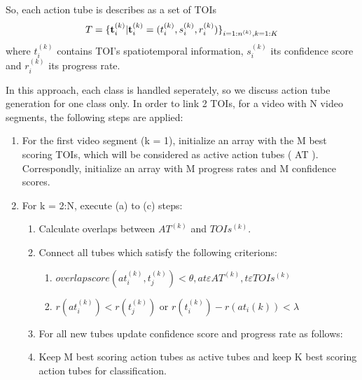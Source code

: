 \documentclass{report}
\begin{document}
So, each action tube is describes as a set of TOIs
\[  T = {\{ {\bf t}_i^{(k)} | {\bf t}_i^{(k)} = ( t_i^{(k)}, s_i^{(k)}, r_i^{(k)} ) \}}_{i=1:n^{(k)},k=1:K} \]
where $ t_i^{(k)} $ contains TOI's spatiotemporal information, $ s_i^{(k)} $ its confidence score and $ r_i^{(k)} $ its progress rate.

In this approach, each class is handled seperately, so we discuss action tube generation for one class only. In order to link 2 TOIs, for
a video with N video segments, the following steps are applied:
\begin{enumerate}
\item For the first video segment (k = 1), initialize an array with the M best scoring TOIs, which will be considered as active action tubes ( AT ).
  Correspondly, initialize an array with M progress rates  and M confidence scores.
\item For k = 2:N, execute (a) to (c) steps:
  \begin{enumerate}
  \item Calculate overlaps between $ AT^{(k)} $ and $ TOIs^{(k)}. $
  \item Connect all tubes which satisfy the following criterions:
    \begin{enumerate}
    \item $ overlap score(at_i^{(k)},t_j^{(k)})   < \theta, 
      at  \varepsilon AT^{(k)}, t \varepsilon TOIs^{(k)}  $
    \item $r(at_i^{(k)}) < r(t_j^{(k)}) $ or 
      $r(t_i^{(k)}) - r(at_i{(k)}) < \lambda $
    \end{enumerate}
    
  \item For all new tubes update confidence score and progress rate as follows:
  \item Keep M best scoring action tubes as active tubes and keep K best scoring action tubes for classification.
  \end{enumerate}
  
\end{enumerate}
\end{document}
